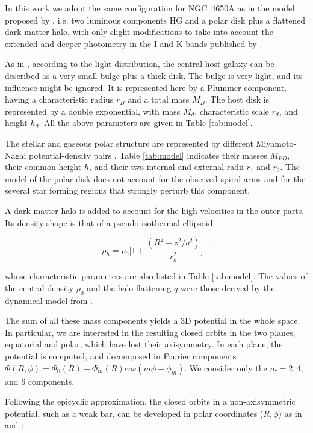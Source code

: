\documentclass{aa}
\begin{document}
  In this work we adopt the same configuration for NGC~4650A as in
  the model proposed by \citet{Combes1996}, i.e. two luminous components HG and a polar
  disk plus a flattened dark matter halo, with only slight
  modifications to take into account the extended and deeper photometry in the I and K bands
  published by \citet{Iod02}.

As in \citet{Combes1996}, according to the light distribution, the
central host galaxy can be described as a very small bulge plus  a
  thick disk. The bulge is very light, and its influence might be
ignored. It is represented here by a Plummer component, having a
characteristic radius  $r_B$ and a total mass $M_B$.  The host
disk is represented by a double exponential, with mass $M_d$,
characteristic scale $r_d$, and height $h_d$. All the above parameters
are given in Table \ref{tab:model}.

The stellar and gaseous polar structure are represented by different
Miyamoto-Nagai potential-density pairs \citep{MN1975}. Table
\ref{tab:model} indicates their masses $M_{PD}$, their common height
$h$, and their two internal and external radii $r_1$ and $r_2$. 
  The model of the polar disk does not account for the observed spiral
  arms and for the several star forming regions that strongly perturb
  this component.

A dark matter halo is added to account for the  high
  velocities in the outer parts. Its density shape is that of a
pseudo-isothermal ellipsoid

$$ \rho_h = \rho_0 \Big[1 + \frac{(R^2 + z^2/q^2)}{r_h^2}\Big]^{-1} $$

\noindent whose characteristic parameters are also listed in Table
\ref{tab:model}.   The values of the central density $\rho_0$ and
  the halo flattening $q$ were those derived by the dynamical model
  from \citet{Combes1996}.

The sum of all these mass components yields a 3D
potential in the whole space.  In particular, we are interested  in the
resulting closed orbits in the two planes, equatorial and polar, which
have lost their axisymmetry.  In each plane, the potential is
computed, and decomposed in Fourier components
$ \Phi(R,\phi) = \Phi_0(R) + \Phi_m(R) cos(m\phi -\phi_m) $.  We
consider only the $m=2,4,$ and $6$ components.


Following the epicyclic approximation, the closed orbits in a
non-axisymmetric potential, such as a weak bar, can be developed in
polar coordinates ($R, \phi$) as in \citet{Binney1987} and \citet{Schoenmakers1997}:
\end{document}

